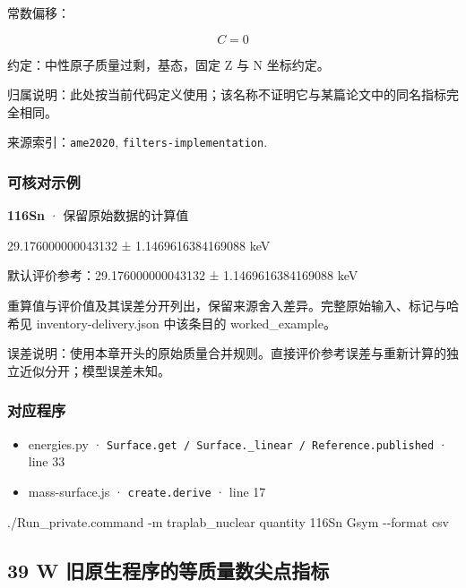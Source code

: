 \documentclass[
  11pt,
  letterpaper,
]{article}
\newenvironment{Shaded}{}{}
\newcommand{\AttributeTok}[1]{\textcolor[rgb]{0.49,0.56,0.16}{#1}}
\newcommand{\ExtensionTok}[1]{#1}
\newcommand{\NormalTok}[1]{#1}
\providecommand{\tightlist}{%
  \setlength{\itemsep}{0pt}\setlength{\parskip}{0pt}}
\begin{document}
常数偏移：

\[
C=0
\]

约定：中性原子质量过剩，基态，固定 Z 与 N 坐标约定。

归属说明：此处按当前代码定义使用；该名称不证明它与某篇论文中的同名指标完全相同。

来源索引：\texttt{ame2020}, \texttt{filters-implementation}.

\subsubsection{可核对示例}\label{ux53efux6838ux5bf9ux793aux4f8b-37}

\textbf{116Sn} · 保留原始数据的计算值

29.176000000043132 ± 1.1469616384169088 keV

默认评价参考：29.176000000043132 ± 1.1469616384169088 keV

重算值与评价值及其误差分开列出，保留来源舍入差异。完整原始输入、标记与哈希见
inventory-delivery.json 中该条目的 worked\_example。

误差说明：使用本章开头的原始质量合并规则。直接评价参考误差与重新计算的独立近似分开；模型误差未知。

\subsubsection{对应程序}\label{ux5bf9ux5e94ux7a0bux5e8f-37}

\begin{itemize}
\tightlist
\item
  energies.py ·
  \texttt{Surface.get\ /\ Surface.\_linear\ /\ Reference.published} ·
  line 33
\item
  mass-surface.js · \texttt{create.derive} · line 17
\end{itemize}

\begin{Shaded}
\begin{Highlighting}[]
\ExtensionTok{./Run\_private.command} \AttributeTok{{-}m}\NormalTok{ traplab\_nuclear quantity 116Sn Gsym }\AttributeTok{{-}{-}format}\NormalTok{ csv}
\end{Highlighting}
\end{Shaded}

\subsection{39 W
旧原生程序的等质量数尖点指标}\label{w-ux65e7ux539fux751fux7a0bux5e8fux7684ux7b49ux8d28ux91cfux6570ux5c16ux70b9ux6307ux6807}
\end{document}

